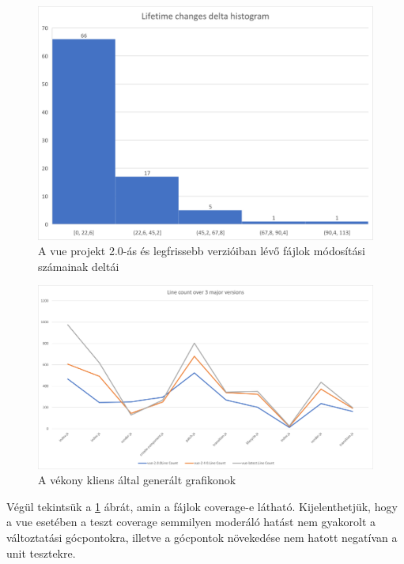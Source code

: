 \begin{figure}[H]
    \centering
    \includegraphics[width=1\textwidth]{images/vue/vue-all-lifetime-changes-delta-hist.png}
    \caption{A vue projekt 2.0-ás és legfrissebb verzióiban lévő fájlok módosítási számainak deltái}
    \label{fig:vue-all-delta-hist}
\end{figure}

\begin{figure}[H]
    \centering
    \includegraphics[width=1\textwidth]{images/vue/vue-all-line-count.png}
    \caption{A vékony kliens által generált grafikonok}
    \label{fig:vue-all-line-count}
\end{figure}

Végül tekintsük a \ref{fig:vue-all-delta-hist} ábrát, amin a fájlok coverage-e látható. Kijelenthetjük, hogy a vue esetében a teszt coverage semmilyen moderáló hatást nem gyakorolt a változtatási gócpontokra, illetve a gócpontok növekedése nem hatott negatívan a unit tesztekre.

